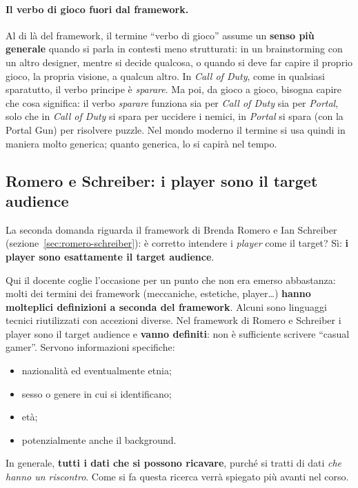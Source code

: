 \paragraph{Il verbo di gioco fuori dal framework.} Al di là del framework, il
termine ``verbo di gioco'' assume un \textbf{senso più generale} quando si
parla in contesti meno strutturati: in un brainstorming con un altro
designer, mentre si decide qualcosa, o quando si deve far capire il proprio
gioco, la propria visione, a qualcun altro. In \emph{Call of Duty}, come in
qualsiasi sparatutto, il verbo principe è \emph{sparare}. Ma poi, da gioco a
gioco, bisogna capire che cosa significa: il verbo \emph{sparare} funziona sia
per \emph{Call of Duty} sia per \emph{Portal}, solo che in \emph{Call of Duty}
si spara per uccidere i nemici, in \emph{Portal} si spara (con la Portal Gun)
per risolvere puzzle. Nel mondo moderno il termine si usa quindi in maniera
molto generica; quanto generica, lo si capirà nel tempo.

\subsection{Romero e Schreiber: i player sono il target audience}

La seconda domanda riguarda il framework di Brenda Romero e Ian Schreiber
(sezione~\ref{sec:romero-schreiber}): è corretto intendere i \emph{player}
come il target? Sì: \textbf{i player sono esattamente il target audience}.

Qui il docente coglie l'occasione per un punto che non era emerso abbastanza:
molti dei termini dei framework (meccaniche, estetiche, player\dots)
\textbf{hanno molteplici definizioni a seconda del framework}. Alcuni sono
linguaggi tecnici riutilizzati con accezioni diverse. Nel framework di Romero
e Schreiber i player sono il target audience e \textbf{vanno definiti}: non è
sufficiente scrivere ``casual gamer''. Servono informazioni specifiche:
\begin{itemize}
  \item nazionalità ed eventualmente etnia;
  \item sesso o genere in cui si identificano;
  \item età;
  \item potenzialmente anche il background.
\end{itemize}
In generale, \textbf{tutti i dati che si possono ricavare}, purché si tratti
di dati \emph{che hanno un riscontro}. Come si fa questa ricerca verrà
spiegato più avanti nel corso.

